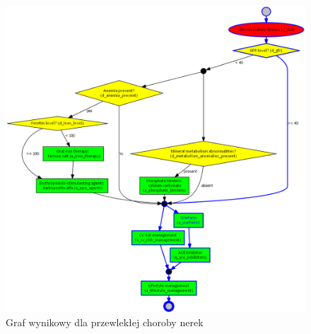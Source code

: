 \begin{figure}[H]
\centering
\includegraphics[scale=0.4]{img/rozwiazanie1ckd-simplified-ver-5.png}
\caption{Graf wynikowy dla przewlekłej choroby nerek}
\label{fig:rozw_ckd}
\end{figure}
